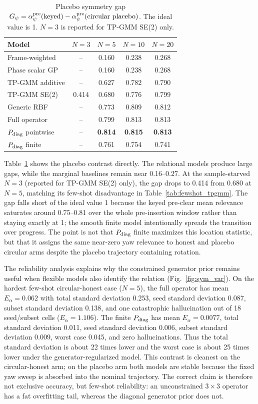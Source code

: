 \documentclass[letterpaper,10pt,conference]{ieeeconf}
\begin{document}
\begin{table}[t]
\centering
\caption{Placebo symmetry gap
$G_\psi=\alpha_\psi^{\rm pre}(\mathrm{keyed})-
\alpha_\psi^{\rm pre}(\mathrm{circular\ placebo})$. The ideal value is 1.
$N{=}3$ is reported for TP-GMM SE(2) only.}
\label{tab:sym_gap}
\small
\setlength{\tabcolsep}{4.0pt}
\begin{tabular}{lcccc}
\toprule
Model & $N=3$ & $N=5$ & $N=10$ & $N=20$\\
\midrule
Frame-weighted & -- & 0.160 & 0.238 & 0.268\\
Phase scalar GP & -- & 0.160 & 0.238 & 0.268\\
TP-GMM additive & -- & 0.627 & 0.782 & 0.790\\
TP-GMM SE(2) & 0.414 & 0.680 & 0.776 & 0.799\\
Generic RBF & -- & 0.773 & 0.809 & 0.812\\
Full operator & -- & 0.799 & 0.813 & 0.813\\
$P_{\rm diag}$ pointwise & -- & \textbf{0.814} & \textbf{0.815} & \textbf{0.813}\\
$P_{\rm diag}$ finite & -- & 0.761 & 0.754 & 0.741\\
\bottomrule
\end{tabular}
\end{table}

Table~\ref{tab:sym_gap} shows the placebo contrast directly. The relational
models produce large gaps, while the marginal baselines remain near 0.16--0.27.
At the sample-starved $N{=}3$ (reported for TP-GMM SE(2) only), the gap drops to
0.414 from 0.680 at $N{=}5$, matching its few-shot disadvantage in
Table~\ref{tab:fewshot_tpgmm}.
The gap falls short of the ideal value 1 because the keyed pre-clear mean
relevance saturates around 0.75--0.81 over the whole pre-insertion window rather
than staying exactly at 1; the smooth finite model intentionally spreads the
transition over progress. The point is not that $P_{\rm diag}$ finite maximizes
this location statistic, but that it assigns the same near-zero yaw relevance
to honest and placebo circular arms despite the placebo trajectory containing
rotation.

The reliability analysis explains why the constrained generator prior remains
useful when flexible models also identify the relation
(Fig.~\ref{fig:sym_var}). On the hardest few-shot circular-honest case
($N=5$), the full operator has mean
$E_\alpha=0.062$ with total standard deviation 0.253, seed standard deviation
0.087, subset standard deviation 0.138, and one catastrophic hallucination out
of 18 seed/subset cells ($E_\alpha=1.106$). The finite $P_{\rm diag}$ has mean
$E_\alpha=0.0077$, total standard deviation 0.011, seed standard deviation
0.006, subset standard deviation 0.009, worst case 0.045, and zero
hallucinations. Thus the total standard deviation is about 22 times lower and
the worst case is about 25 times lower under the generator-regularized model.
This contrast is cleanest on the circular-honest arm; on the placebo arm both
models are stable because the fixed yaw sweep is absorbed into the nominal
trajectory. The correct claim is therefore not exclusive accuracy, but
few-shot reliability: an unconstrained $3\times3$ operator has a fat
overfitting tail, whereas the diagonal generator prior does not.
\end{document}
